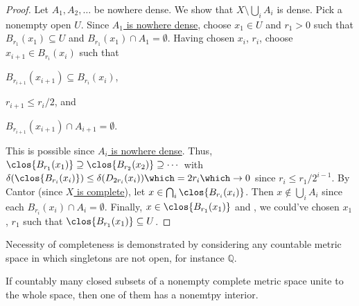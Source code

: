 	\begin{proof}
		Let $A_1, A_2, \ldots$ be nowhere dense. We show that $X\setminus \bigcup_i A_i$ is dense. Pick a nonempty open $U$. Since \uline{$A_1$ is nowhere dense}, choose $x_1\in U$ and $r_1 > 0$ such that $B_{r_1}(x_1)\subseteq U$ and $B_{r_1}(x_1)\cap A_1 = \emptyset$. Having chosen
		$x_i$, $r_i$, choose $x_{i + 1}\in B_{r_i}(x_i)$ such that
		\begin{assmplist}
			\item $B_{r_{i + 1}}(x_{i + 1})\subseteq B_{r_i}(x_i)$,
			\item $r_{i + 1}\le r_i/2$, and
			\item $B_{r_{i + 1}}(x_{i + 1})\cap A_{i + 1} = \emptyset$.
		\end{assmplist}
		This is possible since \uline{$A_i$ is nowhere dense}.
		Thus, $\clos{B_{r_1}(x_1)}\supseteq\clos{B_{r_2}(x_2)}\supseteq\cdots$ with $\delta(\clos{B_{r_i}(x_i)})\le\delta(D_{2r_i}(x_i)) \which = 2r_i\which\to 0$ since $r_i\le r_1/2^{i - 1}$. By Cantor (since \uline{$X$ is complete}), let $x\in\bigcap_i\clos{B_{r_i}(x_i)}$. Then $x\notin \bigcup_i A_i$ since each $B_{r_i}(x_i)\cap A_i = \emptyset$. Finally, $x\in \clos{B_{r_1}(x_1)}$ and \wlogg, we could've chosen $x_1$, $r_1$ such that $\clos{B_{r_1}(x_1)}\subseteq U$.
	\end{proof}
	
	\begin{rmk}
		Necessity of completeness is demonstrated by considering any countable metric space in which singletons are not open, for instance $\mathbb Q$.
	\end{rmk}
	
	\begin{cor}
		If countably many closed subsets of a nonempty complete metric space unite to the whole space, then one of them has a nonemtpy interior.
	\end{cor}